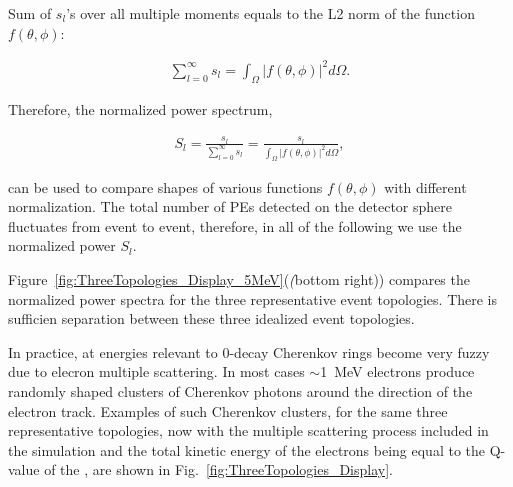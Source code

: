 Sum of $s_l$'s over all multiple moments equals to the L2 norm of the function $f(\theta,\phi)$:

\begin{eqnarray}
\label{eq5}
\sum_{l=0}^{\infty} s_l = \int_{\Omega} |f(\theta,\phi)|^2 d\Omega.
\end{eqnarray}

Therefore, the normalized power spectrum,

\begin{eqnarray}
\label{eq6}
S_l = \frac{s_l}{\sum_{l=0}^{\infty} s_l} =  \frac{s_l}{\int_{\Omega} |f(\theta,\phi)|^2 d\Omega},
\end{eqnarray}

can be used to compare shapes of various functions $f(\theta,\phi)$ with different normalization. The total number of PEs detected on the detector sphere fluctuates from event to event, therefore, in all of the following we use the normalized power $S_l$.

Figure~\ref{fig:ThreeTopologies_Display_5MeV}(\emph(bottom right)) compares the normalized power spectra for the three representative event topologies.
There is sufficien separation between these three idealized event topologies.

In practice, at energies relevant to 0\nbb-decay Cherenkov rings become very fuzzy due to elecron multiple scattering. In most cases $\sim$1~MeV 
electrons produce randomly shaped clusters of Cherenkov photons around the direction of the electron track. Examples of such Cherenkov clusters, 
for the same three representative topologies, now with the multiple scattering process included in the simulation and the total kinetic energy of 
the electrons being equal to the Q-value of the \Te, are shown in Fig.~\ref{fig:ThreeTopologies_Display}.


